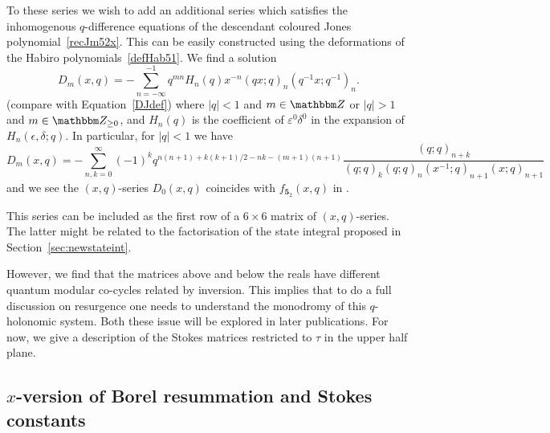 \documentclass[12pt,reqno]{amsart}
\theoremstyle{definition}
\def\BZ{\mathbbm Z}
\def\be{\begin{equation}}
\def\ee{\end{equation}}
\def\ve{\varepsilon}
\def\md{\mathbf}
\newcommand{\knot}[1]{\md{#1}}
\begin{document}
To these series we wish to add an additional series which satisfies the inhomogenous
$q$-difference equations of the descendant coloured Jones polynomial~\eqref{recJm52x}.
This can be easily constructed using the deformations of the Habiro
polynomials~\eqref{defHab51}. We find a solution
\begin{equation}
  D_m(x,q)
  =
  -\sum_{n=-\infty}^{-1}q^{mn}
  H_{n}(q)x^{-n}(qx;q)_{n}(q^{-1}x;q^{-1})_{n}.
\end{equation}
(compare with Equation~\eqref{DJdef}) 
where $|q|<1$ and $m\in\BZ$ or $|q|>1$ and $m\in\BZ_{\geq0}$, and $H_{n}(q)$ is the
coefficient of $\ve^0\delta^0$ in the expansion of $H_{n}(\epsilon,\delta;q)$. In
particular, for $|q|<1$ we have
\be
  D_m(x,q)
  =
  -\sum_{n,k=0}^\infty(-1)^kq^{n(n+1)+k(k+1)/2-nk-(m+1)(n+1)}
  \frac{(q;q)_{n+k}}{(q;q)_k(q;q)_n(x^{-1};q)_{n+1}(x;q)_{n+1}}
\ee
and we see the $(x,q)$-series $D_0(x,q)$ coincides with
$f_{\knot{5}_2}(x,q)$ in \cite{Park:2020edg,park-inverted}.

This series can be included as the first row of a $6\times6$ matrix of $(x,q)$-series.
The latter might be related to the factorisation of the state integral proposed
in Section~\ref{sec:newstateint}.

However, we find that the matrices above and below the reals have different
quantum modular co-cycles related by inversion. This implies that to do a full
discussion on resurgence one needs to understand the monodromy of this $q$-holonomic
system. Both these issue will be explored in later publications. For now, we give a
description of the Stokes matrices restricted to $\tau$ in the upper half plane.

\subsection{$x$-version of Borel resummation and Stokes constants}
\label{sub.52borelx}
\end{document}
